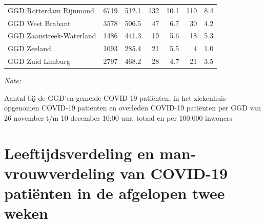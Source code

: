 \documentclass[
  english,
  man,floatsintext]{apa6}
\begin{document}
\begin{table}[H]
\begin{threeparttable}
\begin{tabular}{lrrrrrr}
GGD Rotterdam Rijnmond & 6719 & 512.1 & 132 & 10.1 & 110 & 8.4\\
GGD West Brabant & 3578 & 506.5 & 47 & 6.7 & 30 & 4.2\\
GGD Zaanstreek-Waterland & 1486 & 441.3 & 19 & 5.6 & 18 & 5.3\\
GGD Zeeland & 1093 & 285.4 & 21 & 5.5 & 4 & 1.0\\
GGD Zuid Limburg & 2797 & 468.2 & 28 & 4.7 & 21 & 3.5\\
\bottomrule
\end{tabular}
\begin{tablenotes}
\item \textit{Note: } 
\item Aantal bij de GGD’en gemelde COVID-19 patiënten, in het ziekenhuis opgenomen COVID-19 patiënten en overleden COVID-19 patiënten per GGD van 26 november t/m 10 december 10:00 uur, totaal en per 100.000 inwoners
\end{tablenotes}
\end{threeparttable}
\endgroup{}
\end{table}

\newpage

\hypertarget{leeftijdsverdeling-en-man-vrouwverdeling-van-covid-19-patiuxebnten-in-de-afgelopen-twee-weken}{%
\section{Leeftijdsverdeling en man-vrouwverdeling van COVID-19 patiënten in de afgelopen twee weken}\label{leeftijdsverdeling-en-man-vrouwverdeling-van-covid-19-patiuxebnten-in-de-afgelopen-twee-weken}}
\end{document}
